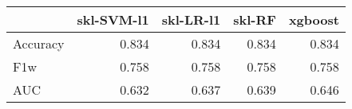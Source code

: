 \begin{tabular}{lrrrr}
\toprule
{} &  skl-SVM-l1 &  skl-LR-l1 &  skl-RF &  xgboost \\
\midrule
Accuracy &       0.834 &      0.834 &   0.834 &    0.834 \\
F1w      &       0.758 &      0.758 &   0.758 &    0.758 \\
AUC      &       0.632 &      0.637 &   0.639 &    0.646 \\
\bottomrule
\end{tabular}

